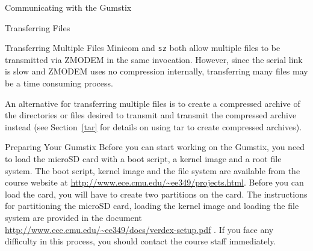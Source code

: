 \documentclass{article}
\begin{document}
\begin{section}{Communicating with the Gumstix}
\begin{subsection}{Transferring Files}
			\begin{subsubsection}{Transferring Multiple Files}
				Minicom and \texttt{sz} both allow multiple files to be transmitted via
				ZMODEM in the same invocation.  However, since the serial link is slow and
				ZMODEM uses no compression internally, transferring many files may be a
				time consuming process.

				An alternative for transferring multiple files is to create a compressed
				archive of the directories or files desired to transmit and transmit the
				compressed archive instead (see Section~\ref{tar} for details on using tar
				to create compressed archives).
			\end{subsubsection}
		\end{subsection}
	\end{section}
	
	\begin{section} {Preparing Your Gumstix} \label{prepare}
	Before you can start working on the Gumstix, you need to load
	the microSD card with a boot script, a kernel image and a root
	file system. The boot script, kernel image and the file system
	are available from the course website at
	\url{http://www.ece.cmu.edu/~ee349/projects.html}. Before you
	can load the card, you will have to create two partitions on
	the card. The instructions for partitioning the microSD card,
	loading the kernel image and loading the file system are provided
	in the document
	\url{http://www.ece.cmu.edu/~ee349/docs/verdex-setup.pdf} . If
	you face any difficulty in this process, you should contact the 
	course staff immediately.
	\end{section}
	
\end{document}

